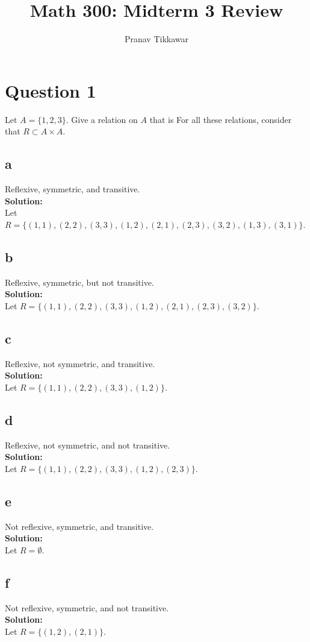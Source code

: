 \documentclass{article}
\author{Pranav Tikkawar}
\title{Math 300: Midterm 3 Review}
\begin{document}
\maketitle
\section*{Question 1}
Let $A = \{1,2,3\}$. Give a relation on $A$ that is
For all these relations, consider that $R \subset A \times A$.
\subsection*{a}
Reflexive, symmetric, and transitive.\\
\textbf{Solution:}\\
Let $R = \{(1,1), (2,2), (3,3), (1,2), (2,1), (2,3), (3,2), (1,3), (3,1)\}$.
\subsection*{b}
Reflexive, symmetric, but not transitive. \\
\textbf{Solution:}\\
Let $R = \{(1,1), (2,2), (3,3), (1,2),(2,1),(2,3),(3,2)\}$.
\subsection*{c}
Reflexive, not symmetric, and transitive.\\
\textbf{Solution:}\\
Let $R = \{(1,1), (2,2), (3,3), (1,2)\}$.
\subsection*{d}
Reflexive, not symmetric, and not transitive.\\
\textbf{Solution:}\\
Let $R = \{(1,1), (2,2), (3,3), (1,2), (2,3)\}$.
\subsection*{e}
Not reflexive, symmetric, and transitive.\\
\textbf{Solution:}\\
Let $R = \emptyset $.
\subsection*{f}
Not reflexive, symmetric, and not transitive.\\
\textbf{Solution:}\\
Let $R = \{(1,2), (2,1)\}$.
\end{document}
